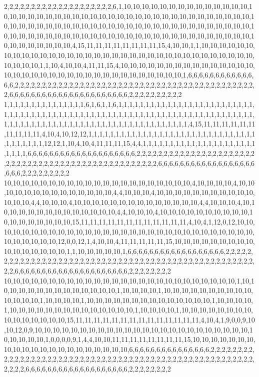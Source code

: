 2,2,2,2,2,2,2,2,2,2,2,2,2,2,2,2,2,2,2,2,6,1,10,10,10,10,10,10,10,10,10,10,10,10,10,10,10,10,10,10,10,10,10,10,10,10,10,10,10,10,10,10,10,10,10,10,10,10,10,10,10,10,10,10,10,10,10,10,10,10,10,10,10,10,10,10,10,10,10,10,10,10,10,10,10,10,10,10,10,10,10,10,10,10,10,10,10,10,10,10,10,10,10,10,10,10,10,10,10,10,10,10,10,10,10,10,10,10,10,10,10,10,10,10,10,10,10,10,4,15,11,11,11,11,11,11,11,11,15,4,10,10,1,1,10,10,10,10,10,10,10,10,10,10,10,10,10,10,10,10,10,10,10,10,10,10,10,10,10,10,10,10,10,10,10,10,10,10,10,10,10,10,1,1,10,4,10,10,4,11,11,15,4,10,10,10,10,10,10,10,10,10,10,10,10,10,10,10,10,10,10,10,10,10,10,10,10,10,10,10,10,10,10,10,10,10,10,10,1,6,6,6,6,6,6,6,6,6,6,6,6,6,6,2,2,2,2,2,2,2,2,2,2,2,2,2,2,2,2,2,2,2,2,2,2,2,2,2,2,2,2,2,2,2,2,2,2,2,2,2,2,2,2,2,2,2,2,2,6,6,6,6,6,6,6,6,6,6,6,6,6,6,6,6,6,6,6,6,6,6,2,2,2,2,2,2,2,2,2,2
1,1,1,1,1,1,1,1,1,1,1,1,1,1,1,6,1,6,1,1,6,1,1,1,1,1,1,1,1,1,1,1,1,1,1,1,1,1,1,1,1,1,1,1,1,1,1,1,1,1,1,1,1,1,1,1,1,1,1,1,1,1,1,1,1,1,1,1,1,1,1,1,1,1,1,1,1,1,1,1,1,1,1,1,1,1,1,1,1,1,1,1,1,1,1,1,1,1,1,1,1,1,1,1,1,1,1,1,1,1,1,1,1,1,1,1,1,1,1,1,1,1,1,1,1,1,4,15,11,11,11,11,11,11,11,11,11,11,4,10,4,10,12,12,1,1,1,1,1,1,1,1,1,1,1,1,1,1,1,1,1,1,1,1,1,1,1,1,1,1,1,1,1,1,1,1,1,1,1,1,1,1,12,12,1,10,4,10,4,11,11,11,15,4,4,1,1,1,1,1,1,1,1,1,1,1,1,1,1,1,1,1,1,1,1,1,1,1,1,1,6,6,6,6,6,6,6,6,6,6,6,6,6,6,6,6,6,6,6,6,2,2,2,2,2,2,2,2,2,2,2,2,2,2,2,2,2,2,2,2,2,2,2,2,2,2,2,2,2,2,2,2,2,2,2,2,2,2,2,2,2,2,2,2,2,2,2,2,2,2,6,6,6,6,6,6,6,6,6,6,6,6,6,6,6,6,6,6,6,6,6,2,2,2,2,2,2,2,2,2
10,10,10,10,10,10,10,10,10,10,10,10,10,10,10,10,10,10,10,10,10,4,10,10,10,10,4,10,10,10,10,10,10,10,10,10,10,10,10,10,10,4,4,10,10,10,4,10,10,10,10,10,10,10,10,10,10,10,10,10,10,4,4,10,10,10,4,10,10,10,10,10,10,10,10,10,10,10,10,10,10,4,4,10,10,10,4,10,10,10,10,10,10,10,10,10,10,10,10,10,10,4,4,10,10,10,4,10,10,10,10,10,10,10,10,10,10,10,10,10,10,10,10,10,10,15,11,11,11,11,11,11,11,11,11,11,11,11,4,10,4,1,12,0,12,10,10,10,10,10,10,10,10,10,10,10,10,10,10,10,10,10,10,10,10,10,10,10,10,10,10,10,10,10,10,10,10,10,10,10,10,12,0,0,12,1,4,10,10,4,11,11,11,11,11,15,10,10,10,10,10,10,10,10,10,10,10,10,10,10,10,10,1,1,10,10,10,10,10,1,6,6,6,6,6,6,6,6,6,6,6,6,6,6,6,6,6,6,2,2,2,2,2,2,2,2,2,2,2,2,2,2,2,2,2,2,2,2,2,2,2,2,2,2,2,2,2,2,2,2,2,2,2,2,2,2,2,2,2,2,2,2,2,2,2,2,2,2,2,2,2,6,6,6,6,6,6,6,6,6,6,6,6,6,6,6,6,6,6,6,6,6,2,2,2,2,2,2,2,2
10,10,10,10,10,10,10,10,10,10,10,10,10,10,10,10,10,10,10,10,10,10,10,10,10,10,1,10,10,10,10,10,10,10,10,10,10,10,10,10,10,1,10,10,10,10,1,10,10,10,10,10,10,10,10,10,10,10,10,10,10,1,10,10,10,10,1,10,10,10,10,10,10,10,10,10,10,10,10,10,10,1,10,10,10,10,1,10,10,10,10,10,10,10,10,10,10,10,10,10,10,1,10,10,10,10,1,10,10,10,10,10,10,10,10,10,10,10,10,10,10,10,15,11,11,11,11,11,11,11,11,11,11,11,11,11,11,4,10,4,1,9,0,0,9,10,10,12,0,9,10,10,10,10,10,10,10,10,10,10,10,10,10,10,10,10,10,10,10,10,10,10,10,10,10,10,10,10,10,1,0,0,0,0,9,1,4,4,10,10,11,11,11,11,11,11,11,11,15,10,10,10,10,10,10,10,10,10,10,10,10,10,10,10,10,10,10,10,10,10,6,6,6,6,6,6,6,6,6,6,6,6,6,6,6,2,2,2,2,2,2,2,2,2,2,2,2,2,2,2,2,2,2,2,2,2,2,2,2,2,2,2,2,2,2,2,2,2,2,2,2,2,2,2,2,2,2,2,2,2,2,2,2,2,2,2,2,2,2,2,2,2,2,6,6,6,6,6,6,6,6,6,6,6,6,6,6,6,6,6,6,6,2,2,2,2,2,2,2,2
